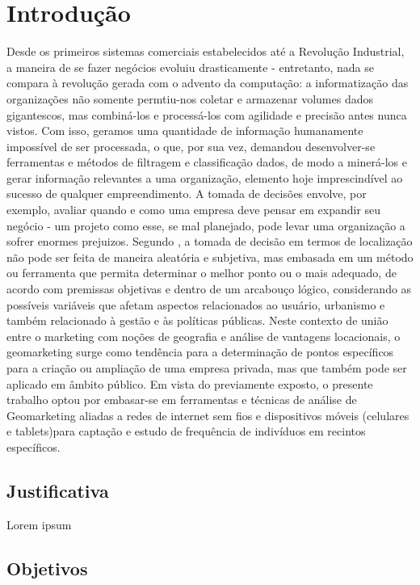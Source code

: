 
\chapter{Introdução}
\label{introducao}

Desde os primeiros sistemas comerciais estabelecidos até a Revolução Industrial, a maneira de se fazer negócios evoluiu drasticamente - entretanto, nada se compara à revolução gerada com o advento da computação: a informatização das organizações não somente permtiu-nos coletar e armazenar volumes dados gigantescos, mas combiná-los e processá-los com agilidade e precisão antes nunca vistos. Com isso, geramos uma quantidade de informação humanamente impossível de ser processada, o que, por sua vez, demandou desenvolver-se ferramentas e métodos de filtragem e classificação dados, de modo a minerá-los e gerar informação relevantes a uma organização, elemento hoje imprescindível ao sucesso de qualquer empreendimento. 
A tomada de decisões envolve, por exemplo, avaliar quando e como uma empresa deve pensar em expandir seu negócio - um projeto como esse, se mal planejado, pode levar uma organização a sofrer enormes prejuizos. Segundo , a tomada de decisão em termos de localização não pode ser feita de maneira aleatória e subjetiva, mas embasada em um método ou ferramenta que permita
determinar o melhor ponto ou o mais adequado, de acordo com premissas objetivas e dentro
de um arcabouço lógico, considerando as possíveis variáveis que afetam aspectos
relacionados ao usuário, urbanismo e também relacionado à gestão e às políticas públicas. Neste contexto de união entre o marketing com noções de geografia e análise de vantagens
locacionais, o geomarketing surge como tendência para a determinação de pontos específicos
para a criação ou ampliação de uma empresa privada, mas que também pode ser aplicado em âmbito público. Em vista do previamente exposto, o presente trabalho optou por embasar-se em ferramentas e técnicas de análise de Geomarketing aliadas a redes de internet sem fios e dispositivos móveis (celulares e tablets)para captação e estudo de frequência de indivíduos em recintos específicos.

\section{Justificativa}
\label{justificativa}

Lorem ipsum

\section{Objetivos}
\label{objetivos}

